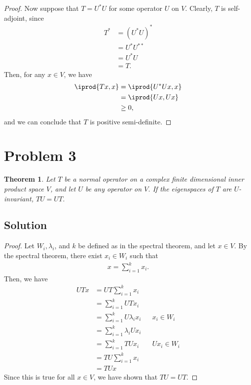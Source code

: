 \documentclass[10pt,a4paper]{article}
\newtheorem{theorem}{Theorem}
\theoremstyle{definition}
\begin{document}
\begin{proof}
Now suppose that $T = U^* U$ for some operator $U$ on $V$. Clearly, $T$ is self-adjoint, since
\begin{align*}
T^* &= (U^* U)^*\\
&= U^* U^{**}\\
&= U^* U\\
&= T.
\end{align*} 
Then, for any $x \in V$, we have
\begin{align*}
\iprod{Tx, x} &= \iprod{U^*U x, x}\\
&= \iprod{U x, U x}\\
&\geq 0,
\end{align*}
and we can conclude that $T$ is positive semi-definite.
\end{proof}

\section*{Problem 3}
\begin{theorem}
Let $T$ be a normal operator on a complex finite dimensional inner product space $V$, and let $U$ be any operator on $V$. If the
eigenspaces of $T$ are $U$-invariant, $TU = UT$.
\end{theorem}

\subsection*{Solution}
\begin{proof}
Let $W_i, \lambda_i$, and $k$ be defined as in the spectral theorem, and let $x \in V$. By the spectral theorem, there exist $x_i \in W_i$ such that
\begin{align*}
x = \sum_{i=1}^k x_i.
\end{align*}
Then, we have 
\begin{align*}
UTx &= UT \sum_{i=1}^k x_i\\
&= \sum_{i=1}^k UTx_i\\
&= \sum_{i=1}^k U \lambda_i x_i &&x_i \in W_i\\
&= \sum_{i=1}^k \lambda_i U x_i\\
&= \sum_{i=1}^k TUx_i && Ux_i \in W_i\\
&= TU \sum_{i=1}^k x_i\\
&= TUx
\end{align*}
Since this is true for all $x \in V$, we have shown that $TU = UT$.
\end{proof}
\end{document}
